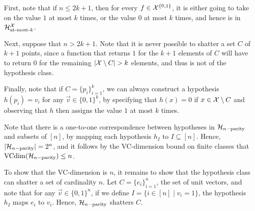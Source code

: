 \begin{ex}
\begin{enumerate}
          First, note that if $n\leq 2k+1$, then for every $f\in \mathcal{X}^{\{0, 1\}}$,
          it is either going to take on the value $1$ at most $k$ times, or the
          value $0$ at most $k$ times, and hence is in
          $\mathcal{H}^{\mathcal{X}}_{\text{at-most-$k$}}$.

          Next, suppose that $n>2k+1$. Note that it is never possible to shatter
          a set $C$ of $k+1$ points, since a function that returns $1$ for the
          $k+1$ elements of $C$ will have to return $0$ for the remaining
          $|\X\setminus C|>k$ elements, and thus is not of the hypothesis class.

          Finally, note that if $C=\{p_i\}_{i=1}^k$, we can always construct a
          hypothesis $h(p_i)=v_i$ for any $\vec{v}\in \{0,1\}^k$, by specifying
          that $h(x)=0$ if $x\in \mathcal{X}\setminus C$ and observing that $h$ then
          assigns the value $1$ at most $k$ times.
  \end{enumerate}
\end{ex}

\begin{ex}
  Note that there is a one-to-one correspondence between hypotheses in
  $\mathcal{H}_{n-\text{parity}}$ and subsets of $[n]$, by mapping each hypothesis $h_I$
  to $I\subseteq [n]$. Hence, $|\mathcal{H}_{n-\text{parity}}|=2^n$, and it follows by
  the VC-dimension bound on finite classes that
  $\operatorname{VCdim}(\mathcal{H}_{n-\text{parity}})\leq n$.

  To show that the VC-dimension is $n$, it remains to show that the hypothesis
  class can shatter a set of cardinality $n$. Let $C=\{e_i\}_{i=1}^n$, the set
  of unit vectors, and note that for any $\vec{v}\in \{0, 1\}^n$, if we define
  $I=\{i\in [n]\mid v_i = 1 \}$, the hypothesis $h_I$ maps $e_i$ to $v_i$.
  Hence, $\mathcal{H}_{n-\text{parity}}$ shatters $C$.
\end{ex}

\begin{ex}
\end{ex}

